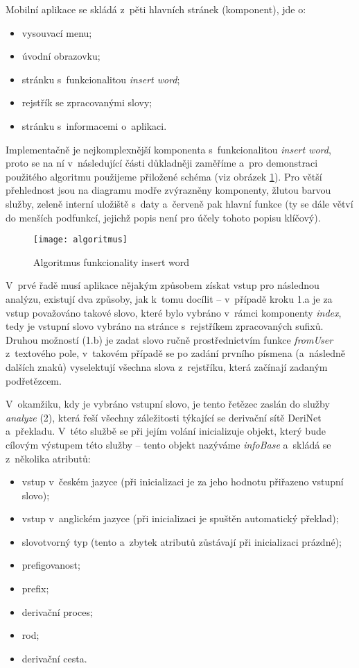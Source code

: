 Mobilní aplikace se skládá z~pěti hlavních stránek (komponent), jde o:

\begin{itemize}
\tightlist
\item
  vysouvací menu;
\item
  úvodní obrazovku;
\item
  stránku s~funkcionalitou \emph{insert word};
\item
  rejstřík se zpracovanými slovy;
\item
  stránku s~informacemi o~aplikaci.
\end{itemize}

Implementačně je nejkomplexnější komponenta s~funkcionalitou
\emph{insert word}, proto se na ní v~následující části důkladněji
zaměříme a~pro demonstraci použitého algoritmu použijeme přiložené
schéma (viz obrázek \ref{algoritmus}). Pro větší přehlednost jsou na
diagramu modře zvýrazněny komponenty, žlutou barvou služby, zeleně
interní uložiště s~daty a~červeně pak hlavní funkce (ty se dále větví do
menších podfunkcí, jejichž popis není pro účely tohoto popisu klíčový).

\begin{figure}[ht]   
    \centering
    \texttt{[image: algoritmus]}  
    \caption{Algoritmus funkcionality insert word}
    \label{algoritmus}
 \end{figure}

V~prvé řadě musí aplikace nějakým způsobem získat vstup pro následnou
analýzu, existují dva způsoby, jak k~tomu docílit -- v~případě kroku 1.a
je za vstup považováno takové slovo, které bylo vybráno v~rámci
komponenty \emph{index}, tedy je vstupní slovo vybráno na stránce
s~rejstříkem zpracovaných sufixů. Druhou možností (1.b) je zadat slovo
ručně prostřednictvím funkce \emph{fromUser} z~textového pole, v~takovém
případě se po zadání prvního písmena (a~následně dalších znaků)
vyselektují všechna slova z~rejstříku, která začínají zadaným
podřetězcem.

V~okamžiku, kdy je vybráno vstupní slovo, je tento řetězec zaslán do
služby \emph{analyze} (2), která řeší všechny záležitosti týkající se
derivační sítě DeriNet a~překladu. V~této službě se při jejím volání
inicializuje objekt, který bude cílovým výstupem této služby -- tento
objekt nazýváme \emph{infoBase} a~skládá se z~několika atributů:

\begin{itemize}
\tightlist
\item
  vstup v~českém jazyce (při inicializaci je za jeho hodnotu přiřazeno
  vstupní slovo);
\item
  vstup v~anglickém jazyce (při inicializaci je spuštěn automatický
  překlad);
\item
  slovotvorný typ (tento a~zbytek atributů zůstávají při inicializaci
  prázdné);
\item
  prefigovanost;
\item
  prefix;
\item
  derivační proces;
\item
  rod;
\item
  derivační cesta.
\end{itemize}

